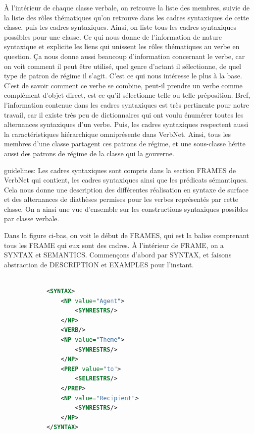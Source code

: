 À l'intérieur de chaque classe verbale, on retrouve la liste des membres, suivie de la liste des rôles thématiques qu'on retrouve dans les cadres syntaxiques de cette classe, puis les cadres syntaxiques. Ainsi, on liste tous les cadres syntaxiques possibles pour une classe. Ce qui nous donne de l'information de nature syntaxique et explicite les liens qui unissent les rôles thématiques au verbe en question. Ça nous donne aussi beaucoup d'information concernant le verbe, car on voit comment il peut être utilisé, quel genre d'actant il sélectionne, de quel type de patron de régime il s'agit. C'est ce qui nous intéresse le plus à la base. C'est de savoir comment ce verbe se combine, peut-il prendre un verbe comme complément d'objet direct, est-ce qu'il sélectionne telle ou telle préposition. Bref, l'information contenue dans les cadres syntaxiques est très pertinente pour notre travail, car il existe très peu de dictionnaires qui ont voulu énumérer toutes les alternances syntaxiques d'un verbe. Puis, les cadres syntaxiques respectent aussi la caractéristiques hiérarchique omniprésente dans VerbNet. Ainsi, tous les membres d'une classe partagent ces patrons de régime, et une sous-classe hérite aussi des patrons de régime de la classe qui la gouverne. 

guidelines: Les cadres syntaxiques sont compris dans la section FRAMES de VerbNet qui contient, les cadres syntaxiques ainsi que les prédicats sémantiques. Cela nous donne une description des différentes réalisation en syntaxe de surface et des alternances de diathèses permises pour les verbes représentés par cette classe. On a ainsi une vue d'ensemble sur les constructions syntaxiques possibles par classe verbale. 

Dans la figure ci-bas, on voit le début de FRAMES, qui est la balise comprenant tous les FRAME qui eux sont des cadres. À l'intérieur de FRAME, on a SYNTAX et SEMANTICS. Commençons d'abord par SYNTAX, et faisons abstraction de DESCRIPTION et EXAMPLES pour l'instant.

\begin{lstlisting}[language=Xml, caption = cadres syntaxiques]

            <SYNTAX>
                <NP value="Agent">
                    <SYNRESTRS/>
                </NP>
                <VERB/>
                <NP value="Theme">
                    <SYNRESTRS/>
                </NP>
                <PREP value="to">
                    <SELRESTRS/>
                </PREP>
                <NP value="Recipient">
                    <SYNRESTRS/>
                </NP>
            </SYNTAX>
\end{lstlisting}


